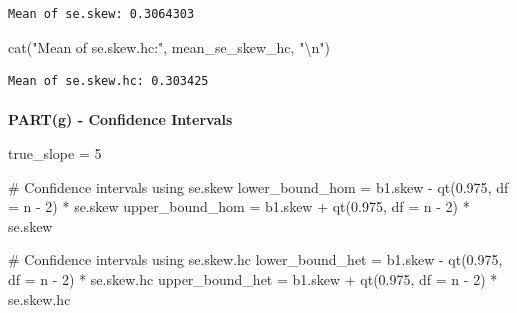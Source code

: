 \documentclass[
  11pt,
]{article}
\makeatletter
\let\oldparagraph\paragraph
\renewcommand{\paragraph}{
    \@ifstar
      \xxxParagraphStar
      \xxxParagraphNoStar
  }
\newcommand{\xxxParagraphStar}[1]{\oldparagraph*{#1}\mbox{}}
\newcommand{\xxxParagraphNoStar}[1]{\oldparagraph{#1}\mbox{}}
\newenvironment{Shaded}{\begin{snugshade}}{\end{snugshade}}
\newcommand{\AttributeTok}[1]{\textcolor[rgb]{0.40,0.45,0.13}{#1}}
\newcommand{\CommentTok}[1]{\textcolor[rgb]{0.37,0.37,0.37}{#1}}
\newcommand{\DecValTok}[1]{\textcolor[rgb]{0.68,0.00,0.00}{#1}}
\newcommand{\FloatTok}[1]{\textcolor[rgb]{0.68,0.00,0.00}{#1}}
\newcommand{\FunctionTok}[1]{\textcolor[rgb]{0.28,0.35,0.67}{#1}}
\newcommand{\NormalTok}[1]{\textcolor[rgb]{0.00,0.23,0.31}{#1}}
\newcommand{\OtherTok}[1]{\textcolor[rgb]{0.00,0.23,0.31}{#1}}
\newcommand{\SpecialCharTok}[1]{\textcolor[rgb]{0.37,0.37,0.37}{#1}}
\newcommand{\StringTok}[1]{\textcolor[rgb]{0.13,0.47,0.30}{#1}}
\makeatother
\begin{document}
\begin{verbatim}
Mean of se.skew: 0.3064303 
\end{verbatim}

\begin{Shaded}
\begin{Highlighting}[]
\FunctionTok{cat}\NormalTok{(}\StringTok{"Mean of se.skew.hc:"}\NormalTok{, mean\_se\_skew\_hc, }\StringTok{"}\SpecialCharTok{\textbackslash{}n}\StringTok{"}\NormalTok{)}
\end{Highlighting}
\end{Shaded}

\begin{verbatim}
Mean of se.skew.hc: 0.303425 
\end{verbatim}

\paragraph{\texorpdfstring{\textbf{PART(g) - Confidence
Intervals}}{PART(g) - Confidence Intervals}}\label{partg---confidence-intervals}

\begin{Shaded}
\begin{Highlighting}[]
\NormalTok{true\_slope }\OtherTok{=} \DecValTok{5}

\CommentTok{\# Confidence intervals using se.skew}
\NormalTok{lower\_bound\_hom }\OtherTok{=}\NormalTok{ b1.skew }\SpecialCharTok{{-}} \FunctionTok{qt}\NormalTok{(}\FloatTok{0.975}\NormalTok{, }\AttributeTok{df =}\NormalTok{ n }\SpecialCharTok{{-}} \DecValTok{2}\NormalTok{) }\SpecialCharTok{*}\NormalTok{ se.skew}
\NormalTok{upper\_bound\_hom }\OtherTok{=}\NormalTok{ b1.skew }\SpecialCharTok{+} \FunctionTok{qt}\NormalTok{(}\FloatTok{0.975}\NormalTok{, }\AttributeTok{df =}\NormalTok{ n }\SpecialCharTok{{-}} \DecValTok{2}\NormalTok{) }\SpecialCharTok{*}\NormalTok{ se.skew}

\CommentTok{\# Confidence intervals using se.skew.hc}
\NormalTok{lower\_bound\_het }\OtherTok{=}\NormalTok{ b1.skew }\SpecialCharTok{{-}} \FunctionTok{qt}\NormalTok{(}\FloatTok{0.975}\NormalTok{, }\AttributeTok{df =}\NormalTok{ n }\SpecialCharTok{{-}} \DecValTok{2}\NormalTok{) }\SpecialCharTok{*}\NormalTok{ se.skew.hc}
\NormalTok{upper\_bound\_het }\OtherTok{=}\NormalTok{ b1.skew }\SpecialCharTok{+} \FunctionTok{qt}\NormalTok{(}\FloatTok{0.975}\NormalTok{, }\AttributeTok{df =}\NormalTok{ n }\SpecialCharTok{{-}} \DecValTok{2}\NormalTok{) }\SpecialCharTok{*}\NormalTok{ se.skew.hc}
\end{Highlighting}
\end{Shaded}
\end{document}
